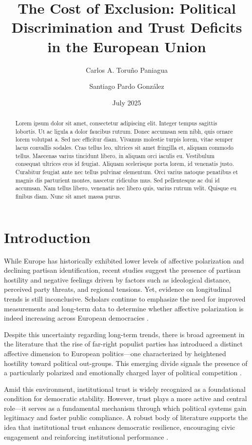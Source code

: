 \documentclass{article}
\title{The Cost of Exclusion: Political Discrimination and Trust Deficits in the European Union}
\author{Carlos A. Toruño Paniagua}
\author{Santiago Pardo González}
\affil{\emph{The World Justice Project}}
\date{July 2025}
\begin{document}
\maketitle

\begin{abstract}
Lorem ipsum dolor sit amet, consectetur adipiscing elit. Integer tempus sagittis lobortis. Ut ac ligula a dolor faucibus rutrum. Donec accumsan sem nibh, quis ornare lorem volutpat a. Sed nec efficitur diam. Vivamus molestie turpis lorem, vitae semper lacus convallis sodales. Cras tellus leo, ultrices sit amet fringilla et, aliquam commodo tellus. Maecenas varius tincidunt libero, in aliquam orci iaculis eu. Vestibulum consequat ultrices eros id feugiat. Aliquam scelerisque porta lorem, id venenatis justo. Curabitur feugiat ante nec tellus pulvinar elementum. Orci varius natoque penatibus et magnis dis parturient montes, nascetur ridiculus mus. Sed pellentesque ac dui id accumsan. Nam tellus libero, venenatis nec libero quis, varius rutrum velit. Quisque eu finibus diam. Nunc sit amet massa purus.
\end{abstract}

\section{Introduction}

While Europe has historically exhibited lower levels of affective polarization and declining partisan identification, recent studies suggest the presence of partisan hostility and negative feelings driven by factors such as ideological distance, perceived party threats, and regional tensions. Yet, evidence on longitudinal trends is still inconclusive. Scholars continue to emphasize the need for improved measurements and long-term data to determine whether affective polarization is indeed increasing across European democracies \parencite{wagner_affective_2024}.

Despite this uncertainty regarding long-term trends, there is broad agreement in the literature that the rise of far-right populist parties has introduced a distinct affective dimension to European politics—one characterized by heightened hostility toward political out-groups. This emerging divide signals the presence of a particularly polarized and emotionally charged layer of political competition \parencite{reiljan_fear_2020, reiljan_andres_affective_2025}.

Amid this environment, institutional trust is widely recognized as a foundational condition for democratic stability. However, trust plays a more active and central role—it serves as a fundamental mechanism through which political systems gain legitimacy and foster public compliance. A robust body of literature supports the idea that institutional trust enhances democratic resilience, encouraging civic engagement and reinforcing institutional performance \parencite{marien_measuring_2011, devine_stability_2024}.
\end{document}
